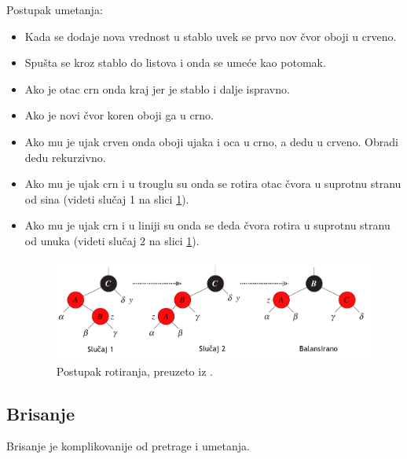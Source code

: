 \documentclass[a4paper]{article}
\begin{document}
    Postupak umetanja:
    \begin{itemize}

    \item Kada se dodaje nova vrednost u stablo uvek se prvo nov čvor oboji u crveno.
    \item Spušta se kroz stablo do listova i onda se umeće kao potomak.
    \item Ako je otac crn onda kraj jer je stablo i dalje ispravno.
    \item Ako je novi čvor koren oboji ga u crno.
    \item Ako mu je ujak crven onda oboji ujaka i oca u crno, a dedu u crveno. Obradi dedu rekurzivno.
    \item Ako mu je ujak crn i u trouglu su onda se rotira otac čvora u suprotnu stranu od sina (videti slučaj 1 na slici \ref{fig:rotation}).
    \item Ako mu je ujak crn i u liniji su onda se deda čvora rotira u suprotnu stranu od unuka (videti slučaj 2 na slici \ref{fig:rotation}).

    \begin{figure}[h!]
        \begin{center}
        \includegraphics[scale=0.26]{rotation.png}
        \end{center}
        \caption{Postupak rotiranja, preuzeto iz \cite{clrs}.}
        \label{fig:rotation}
    \end{figure}

\end{itemize}

\subsection{Brisanje}
Brisanje je komplikovanije od pretrage i umetanja.
\end{document}
